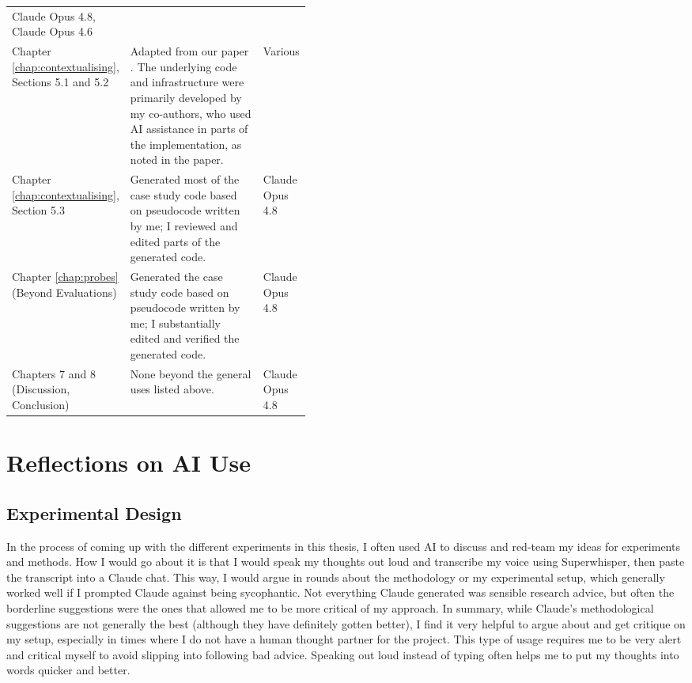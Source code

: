 \begin{table}[htb!]
\begin{tabularx}{\linewidth}{@{} >{\raggedright\arraybackslash}p{0.28\linewidth} X >{\raggedright\arraybackslash}p{0.16\linewidth} @{}}
Claude Opus 4.8, Claude Opus 4.6 \\
\addlinespace[4pt]
Chapter \ref{chap:contextualising}, Sections 5.1 and 5.2 &
Adapted from our paper \cite{kempermann2026safewhomrethinkingevaluate}. The underlying code and infrastructure were primarily developed by my co-authors, who used AI assistance in parts of the implementation, as noted in the paper. &
Various \\
\addlinespace[4pt]
Chapter \ref{chap:contextualising}, Section 5.3 &
Generated most of the case study code based on pseudocode written by me; I reviewed and edited parts of the generated code. &
Claude Opus 4.8 \\
\addlinespace[4pt]
Chapter \ref{chap:probes} (Beyond Evaluations) &
Generated the case study code based on pseudocode written by me; I substantially edited and verified the generated code. &
Claude Opus 4.8 \\
\addlinespace[4pt]
Chapters 7 and 8 (Discussion, Conclusion) &
None beyond the general uses listed above. &
Claude Opus 4.8 \\
\bottomrule
\end{tabularx}
\endgroup
\end{table}

\section{Reflections on AI Use}
\label{app:ai_reflections}

\subsection{Experimental Design}
In the process of coming up with the different experiments in this thesis, I often used AI to discuss and red-team my ideas for experiments and methods. How I would go about it is that I would speak my thoughts out loud and transcribe my voice using Superwhisper, then paste the transcript into a Claude chat. This way, I would argue in rounds about the methodology or my experimental setup, which generally worked well if I prompted Claude against being sycophantic. Not everything Claude generated was sensible research advice, but often the borderline suggestions were the ones that allowed me to be more critical of my approach. In summary, while Claude's methodological suggestions are not generally the best (although they have definitely gotten better), I find it very helpful to argue about and get critique on my setup, especially in times where I do not have a human thought partner for the project. This type of usage requires me to be very alert and critical myself to avoid slipping into following bad advice. Speaking out loud instead of typing often helps me to put my thoughts into words quicker and better.

